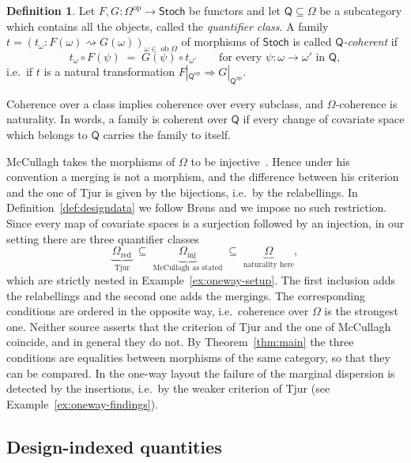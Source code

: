 \documentclass[11pt,a4paper]{article}
\theoremstyle{plain}
\theoremstyle{definition}
\newtheorem{definition}[theorem]{Definition}
\theoremstyle{remark}
\newcommand{\cat}[1]{\mathsf{#1}}
\newcommand{\catO}{\cat{\Omega}}
\newcommand{\Stoch}{\cat{Stoch}}
\newcommand{\op}{\mathrm{op}}
\DeclareMathOperator{\ob}{ob}
\begin{document}
\begin{definition}\label{def:coherence}
Let $F, G \colon \catO^{\op} \to \Stoch$ be functors and let
$\cat{Q} \subseteq \catO$ be a subcategory which contains all the objects,
called the \emph{quantifier class}. A family
$t = (t_{\omega} \colon F(\omega) \rightsquigarrow G(\omega))_{\omega \in \ob\catO}$
of morphisms of $\Stoch$ is called \emph{$\cat{Q}$-coherent} if
\begin{equation}\label{eq:coherence}
t_{\omega} \circ F(\psi) \;=\; G(\psi) \circ t_{\omega'}
\qquad\text{for every } \psi \colon \omega \to \omega' \text{ in } \cat{Q},
\end{equation}
i.e.\ if $t$ is a natural transformation
$F|_{\cat{Q}^{\op}} \Rightarrow G|_{\cat{Q}^{\op}}$.
\end{definition}

Coherence over a class implies coherence over every subclass, and
$\catO$-coherence is naturality. In words, a family is coherent over $\cat{Q}$
if every change of covariate space which belongs to $\cat{Q}$ carries the
family to itself.

McCullagh takes the morphisms of $\catO$ to be
injective~\cite[\S4.1]{mccullagh_what_2002}. Hence under his convention a
merging is not a morphism, and the difference between his criterion and the
one of Tjur is given by the bijections, i.e.\ by the relabellings. In
Definition~\ref{def:designdata} we follow Br\o ns and we impose no such
restriction. Since every map of covariate spaces is a surjection followed by
an injection, in our setting there are three quantifier classes
\[
\underbrace{\catO_{\mathrm{red}}}_{\text{Tjur}}
\;\subseteq\;
\underbrace{\catO_{\mathrm{inj}}}_{\text{McCullagh as stated}}
\;\subseteq\;
\underbrace{\catO}_{\text{naturality here}},
\]
which are strictly nested in Example~\ref{ex:oneway-setup}. The first
inclusion adds the relabellings and the second one adds the mergings. The
corresponding conditions are ordered in the opposite way, i.e.\ coherence over
$\catO$ is the strongest one. Neither source asserts that the criterion of
Tjur and the one of McCullagh coincide, and in general they do not. By
Theorem~\ref{thm:main} the three conditions are equalities between morphisms
of the same category, so that they can be compared. In the one-way layout the
failure of the marginal dispersion is detected by the insertions, i.e.\ by the
weaker criterion of Tjur (see Example~\ref{ex:oneway-findings}).

\subsection{Design-indexed quantities}
\end{document}
